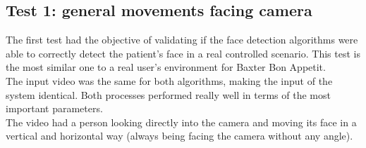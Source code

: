 \documentclass[11pt]{report} %
\begin{document}
\subsection{Test 1: general movements facing camera}
\label{sec:test_1_general_movements_facing_cameras}

The first test had the objective of validating if the face detection algorithms were able to correctly detect the patient's face in a real controlled scenario. This test is the most similar one to a real user's environment for Baxter Bon Appetit.\\

The input video was the same for both algorithms, making the input of the system identical. Both processes performed really well in terms of the most important parameters.\\

The video had a person looking directly into the camera and moving its face in a vertical and horizontal way (always being facing the camera without any angle).\\
\end{document}

